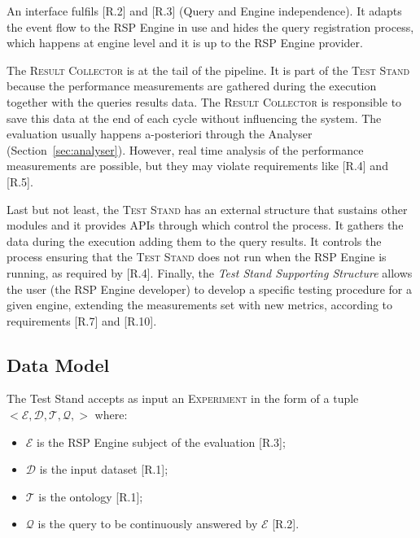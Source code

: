 An interface fulfils [R.2] and [R.3] (Query and Engine independence). It adapts the event flow to the RSP Engine in use and hides the query registration process, which happens at engine level and it is up to the RSP Engine provider.

The \textsc{Result Collector} is at the tail of the pipeline. It is part of the \textsc{Test Stand} because the performance measurements are gathered during the execution together with the queries results data. The \textsc{Result Collector} is responsible to save this data at the end of each cycle without influencing the system. The evaluation usually happens a-posteriori through the Analyser (Section~\ref{sec:analyser}). However, real time analysis of the performance measurements are possible, but they may violate requirements like [R.4] and [R.5]. 

Last but not least, the \textsc{Test Stand} has an external structure that sustains other modules and it provides APIs through which control the process. It gathers the data during the execution adding them to the query results. It controls the process ensuring that the \textsc{Test Stand} does not run when the RSP Engine is running, as required by [R.4]. Finally, the \textit{Test Stand Supporting Structure} allows the user (the RSP Engine developer) to develop a specific testing procedure for a given engine, extending the measurements set with new metrics, according to requirements [R.7] and [R.10].  

\subsection{Data Model}\label{sec:test-stand-data-model}

\noindent The Test Stand accepts as input an \textsc{Experiment} in the form of a tuple \\ $<\mathcal{E},\mathcal{D},\mathcal{T},\mathcal{Q},>$ where:
\begin{itemize}
\item $\mathcal{E}$ is the RSP Engine subject of the evaluation [R.3]; 
\item $\mathcal{D}$ is the input dataset [R.1]; 
\item $\mathcal{T}$ is the ontology [R.1]; 
\item $\mathcal{Q}$ is the query to be continuously answered by $\mathcal{E}$ [R.2]. 
\end{itemize}

